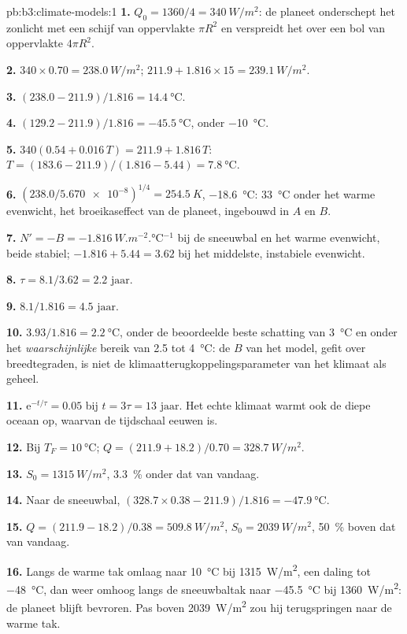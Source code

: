 \begin{solution}{pb:b3:climate-models:1}
\textbf{1.} $Q_0 = 1360/4 = \qty{340}{W/m^2}$: de planeet onderschept het zonlicht met een schijf
van oppervlakte $\pi R^2$ en verspreidt het over
een bol van oppervlakte $4\pi R^2$.

\textbf{2.} $340\times0.70 = \qty{238.0}{W/m^2}$; $211.9 + 1.816\times15 =
\qty{239.1}{W/m^2}$.

\textbf{3.} $(238.0 - 211.9)/1.816 = \qty{14.4}{\celsius}$.

\textbf{4.} $(129.2 - 211.9)/1.816 = \qty{-45.5}{\celsius}$, onder
\qty{-10}{\celsius}.

\textbf{5.} $340(0.54 + 0.016\,T) = 211.9 + 1.816\,T$: $T =
(183.6 - 211.9)/(1.816 - 5.44) = \qty{7.8}{\celsius}$.

\textbf{6.} $(238.0/\num{5.670e-8})^{1/4} = \qty{254.5}{K}$,
\qty{-18.6}{\celsius}: \qty{33}{\celsius} onder het warme evenwicht, het
broeikaseffect van de planeet, ingebouwd in $A$ en $B$.

\textbf{7.} $N' = -B = \qty{-1.816}{W.m^{-2}.\celsius^{-1}}$ bij de
sneeuwbal en het warme evenwicht, beide stabiel; $-1.816 + 5.44 =
\num{+3.62}$ bij het middelste, instabiele evenwicht.

\textbf{8.} $\tau = 8.1/3.62 = \num{2.2}\text{ jaar}$.

\textbf{9.} $8.1/1.816 = \num{4.5}\text{ jaar}$.

\textbf{10.} $3.93/1.816 = \qty{2.2}{\celsius}$, onder de beoordeelde beste
schatting van \qty{3}{\celsius} en onder het \emph{waarschijnlijke} bereik van 2.5 tot
\qty{4}{\celsius}: de $B$ van het model, gefit over breedtegraden, is niet
de klimaatterugkoppelingsparameter van het klimaat als geheel.

\textbf{11.} $\mathrm e^{-t/\tau} = 0.05$ bij $t = 3\tau =
\num{13}\text{ jaar}$. Het echte klimaat warmt ook de diepe oceaan op, waarvan de tijdschaal
eeuwen is.

\textbf{12.} Bij $T_F = \qty{10}{\celsius}$; $Q = (211.9 + 18.2)/0.70 =
\qty{328.7}{W/m^2}$.

\textbf{13.} $S_0 = \qty{1315}{W/m^2}$, \qty{3.3}{\percent} onder dat van vandaag.

\textbf{14.} Naar de sneeuwbal, $(328.7\times0.38 - 211.9)/1.816 =
\qty{-47.9}{\celsius}$.

\textbf{15.} $Q = (211.9 - 18.2)/0.38 = \qty{509.8}{W/m^2}$, $S_0 =
\qty{2039}{W/m^2}$, \qty{50}{\percent} boven dat van vandaag.

\textbf{16.} Langs de warme tak omlaag naar \qty{10}{\celsius} bij
\qty{1315}{W/m^2}, een daling tot \qty{-48}{\celsius}, dan weer omhoog langs de
sneeuwbaltak naar \qty{-45.5}{\celsius} bij \qty{1360}{W/m^2}: de planeet
blijft bevroren. Pas boven \qty{2039}{W/m^2} zou hij terugspringen naar de warme
tak.


\end{solution}
